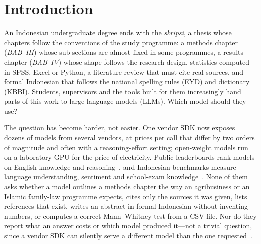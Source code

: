 \section{Introduction}
\label{sec:intro}

An Indonesian undergraduate degree ends with the \emph{skripsi}, a thesis whose chapters follow the conventions of the study programme: a methods chapter (\emph{BAB~III}) whose sub-sections are almost fixed in some programmes, a results chapter (\emph{BAB~IV}) whose shape follows the research design, statistics computed in SPSS, Excel or Python, a literature review that must cite real sources, and formal Indonesian that follows the national spelling rules (EYD) and dictionary (KBBI). Students, supervisors and the tools built for them increasingly hand parts of this work to large language models (LLMs). Which model should they use?

The question has become harder, not easier. One vendor SDK now exposes dozens of models from several vendors, at prices per call that differ by two orders of magnitude and often with a reasoning-effort setting; open-weight models run on a laboratory GPU for the price of electricity. Public leaderboards rank models on English knowledge and reasoning~\cite{hendrycks2021mmlu,liang2023helm}, and Indonesian benchmarks measure language understanding, sentiment and school-exam knowledge~\cite{wilie2020indonlu,koto2020indolem,winata2023nusax,koto2023indommlu,wang2024seaeval}. None of them asks whether a model outlines a methods chapter the way an agribusiness or an Islamic family-law programme expects, cites only the sources it was given, lists references that exist, writes an abstract in formal Indonesian without inventing numbers, or computes a correct Mann--Whitney test from a CSV file. Nor do they report what an answer costs or which model produced it---not a trivial question, since a vendor SDK can silently serve a different model than the one requested~\cite{arya2026paperagent}.

